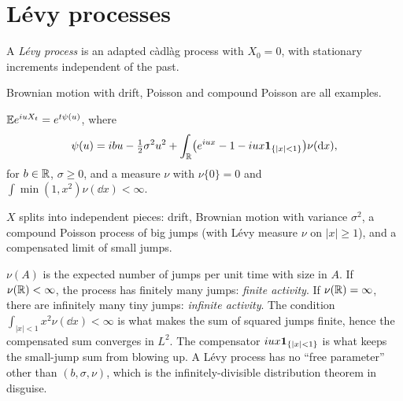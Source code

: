 \section{L\'evy processes}

\begin{definition}
A \emph{L\'evy process} is an adapted c\`adl\`ag process with $X_0=0$, with stationary increments independent of the past.
\end{definition}

Brownian motion with drift, Poisson and compound Poisson are all examples.

\begin{theorem}\label{thm:lk}
$\mathbb{E} e^{iuX_t}=e^{t\psi(u)}$, where
\[
\psi(u)=ibu-\tfrac12\sigma^2u^2+\int_{\mathbb{R}}\bigl(e^{iux}-1-iux\mathbf{1}_{\{|x|<1\}}\bigr)\nu(\mathrm{d} x),
\]
for $b\in\mathbb{R}$, $\sigma\ge0$, and a measure $\nu$ with $\nu\{0\}=0$ and $\int\min(1,x^2)\nu(\dd x)<\infty$.
\end{theorem}

\begin{theorem}\label{thm:li}
$X$ splits into independent pieces: drift, Brownian motion with variance $\sigma^2$, a compound Poisson process of big jumps (with L\'evy measure $\nu$ on $|x|\ge1$), and a compensated limit of small jumps.
\end{theorem}

\begin{intuition}
$\nu(A)$ is the expected number of jumps per unit time with size in $A$. If $\nu(\mathbb{R})<\infty$, the process has finitely many jumps: \emph{finite activity}. If $\nu(\mathbb{R})=\infty$, there are infinitely many tiny jumps: \emph{infinite activity}. The condition $\int_{|x|<1}x^2\nu(\dd x)<\infty$ is what makes the sum of squared jumps finite, hence the compensated sum converges in $L^2$. The compensator $iux\mathbf{1}_{\{|x|<1\}}$ is what keeps the small-jump sum from blowing up. A L\'evy process has no ``free parameter'' other than $(b,\sigma,\nu)$, which is the infinitely-divisible distribution theorem in disguise.
\end{intuition}

